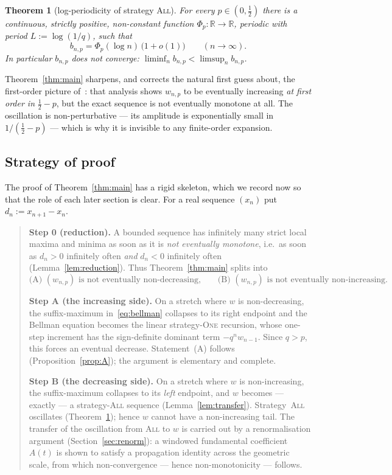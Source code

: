 \documentclass[11pt]{article}
\newtheorem{theorem}{Theorem}[section]
\theoremstyle{definition}
\newcommand{\One}{\textsc{One}}
\newcommand{\All}{\textsc{All}}
\begin{document}
\begin{theorem}[log-periodicity of strategy \All]\label{thm:ALL}
  For every $p\in(0,\tfrac12)$ there is a continuous, strictly
  positive, non-constant function $\Phi_p:\mathbb R\to\mathbb R$,
  periodic with period $L:=\log(1/q)$, such that
  \[
    b_{n,p}=\Phi_p(\log n)\,\bigl(1+o(1)\bigr)\qquad(n\to\infty).
  \]
  In particular $b_{n,p}$ does not converge:
  $\liminf_n b_{n,p}<\limsup_n b_{n,p}$.
\end{theorem}

Theorem~\ref{thm:main} sharpens, and corrects the natural first
guess about, the first-order picture of~\cite{Paper1}: that analysis
shows $w_{n,p}$ to be eventually increasing \emph{at first order in}
$\tfrac12-p$, but the exact sequence is not eventually monotone at
all. The oscillation is non-perturbative --- its amplitude is
exponentially small in $1/(\tfrac12-p)$ --- which is why it is
invisible to any finite-order expansion.

\subsection{Strategy of proof}\label{sec:strategy}

The proof of Theorem~\ref{thm:main} has a rigid skeleton, which we
record now so that the role of each later section is clear. For a
real sequence $(x_n)$ put $d_n:=x_{n+1}-x_n$.

\begin{quote}
\textbf{Step 0 (reduction).} A bounded sequence has infinitely many
strict local maxima and minima as soon as it is \emph{not eventually
monotone}, i.e.\ as soon as $d_n>0$ infinitely often \emph{and}
$d_n<0$ infinitely often (Lemma~\ref{lem:reduction}). Thus
Theorem~\ref{thm:main} splits into
\[
  \text{(A) }(w_{n,p})\text{ is not eventually non-decreasing,}
  \qquad
  \text{(B) }(w_{n,p})\text{ is not eventually non-increasing.}
\]

\textbf{Step A (the increasing side).} On a stretch where $w$ is
non-decreasing, the suffix-maximum in~\eqref{eq:bellman} collapses to
its right endpoint and the Bellman equation becomes the linear
strategy-\One{} recursion, whose one-step increment has the
sign-definite dominant term $-q^{n}w_{n-1}$. Since $q>p$, this forces
an eventual decrease. Statement~(A) follows
(Proposition~\ref{prop:A}); the argument is elementary and complete.

\textbf{Step B (the decreasing side).} On a stretch where $w$ is
non-increasing, the suffix-maximum collapses to its \emph{left}
endpoint, and $w$ becomes --- exactly --- a strategy-\All{} sequence
(Lemma~\ref{lem:transfer}). Strategy~\All{} oscillates
(Theorem~\ref{thm:ALL}); hence $w$ cannot have a non-increasing tail.
The transfer of the oscillation from \All{} to $w$ is carried out by
a renormalisation argument (Section~\ref{sec:renorm}): a windowed
fundamental coefficient $A(t)$ is shown to satisfy a propagation
identity across the geometric scale, from which non-convergence ---
hence non-monotonicity --- follows.
\end{quote}
\end{document}
